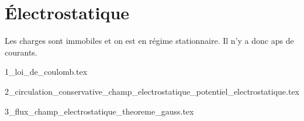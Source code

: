 \chapter{Électrostatique}

Les charges sont immobiles et on est en régime stationnaire. Il n'y a donc aps de courants.

\minitoc

{1_loi_de_coulomb.tex}

{2_circulation_conservative_champ_electrostatique_potentiel_electrostatique.tex}

{3_flux_champ_electrostatique_theoreme_gauss.tex}